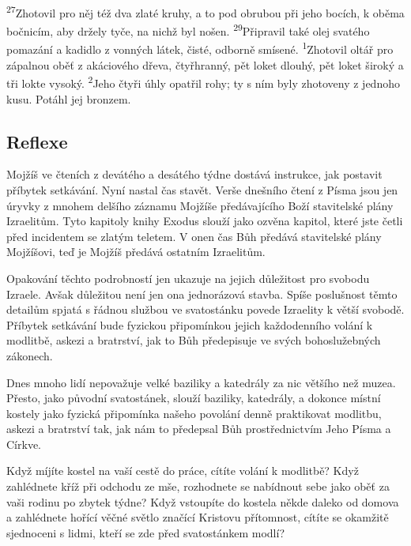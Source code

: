 \documentclass[11pt]{article}
\begin{document}
{\newline
\textsuperscript{27}Zhotovil pro něj též dva zlaté kruhy, a to pod obrubou při jeho bocích, k oběma bočnicím, aby držely tyče, na nichž byl nošen.
\newline
\newline
\textsuperscript{29}Připravil také olej svatého pomazání a kadidlo z vonných látek, čisté, odborně smísené.
\newline
\newline
\textsuperscript{1}Zhotovil oltář pro zápalnou oběť z akáciového dřeva, čtyřhranný, pět loket dlouhý, pět loket široký a tři lokte vysoký.
\textsuperscript{2}Jeho čtyři úhly opatřil rohy; ty s ním byly zhotoveny z jednoho kusu. Potáhl jej bronzem.
}

\subsection*{Reflexe}
Mojžíš ve čteních z devátého a desátého týdne dostává instrukce, jak postavit příbytek setkávání. Nyní nastal čas stavět. Verše
dnešního čtení z Písma jsou jen úryvky z mnohem delšího záznamu Mojžíše předávajícího Boží stavitelské plány Izraelitům. Tyto
kapitoly knihy Exodus slouží jako ozvěna kapitol, které jste četli před incidentem se zlatým teletem. V onen čas Bůh předává
stavitelské plány Mojžíšovi, teď je Mojžíš předává ostatním Izraelitům.

Opakování těchto podrobností jen ukazuje na jejich důležitost pro svobodu Izraele. Avšak důležitou není jen ona jednorázová
stavba. Spíše poslušnost těmto detailům spjatá s řádnou službou ve svatostánku povede Izraelity k větší svobodě. Příbytek
setkávání bude fyzickou připomínkou jejich každodenního volání k modlitbě, askezi a bratrství, jak to Bůh předepisuje ve svých
bohoslužebných zákonech.

Dnes mnoho lidí nepovažuje velké baziliky a katedrály za nic většího než muzea. Přesto, jako původní svatostánek, slouží baziliky,
katedrály, a dokonce místní kostely jako fyzická připomínka našeho povolání denně praktikovat modlitbu, askezi a bratrství tak,
jak nám to předepsal Bůh prostřednictvím Jeho Písma a Církve.

Když míjíte kostel na vaší cestě do práce, cítíte volání k modlitbě? Když zahlédnete kříž při odchodu ze mše, rozhodnete se
nabídnout sebe jako oběť za vaši rodinu po zbytek týdne? Když vstoupíte do kostela někde daleko od domova a zahlédnete hořící
věčné světlo značící Kristovu přítomnost, cítíte se okamžitě sjednoceni s lidmi, kteří se zde před svatostánkem modlí?
\end{document}
